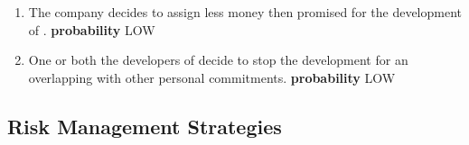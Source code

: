 \begin{itemize}
\begin{itemize}
		
		\begin{enumerate}
			\item The company decides to assign less money then promised for the development of \myTaxiService{}. \newline
			\textbf{probability} LOW
			\item One or both the developers of \myTaxiService{} decide to stop the development for an overlapping with other personal commitments.\newline
			\textbf{probability} LOW
		\end{enumerate}
	\end{itemize}
\end{itemize}
%
\subsection{Risk Management Strategies}





%